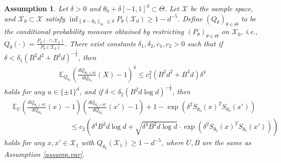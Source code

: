 \documentclass[final,12pt]{colt2018} %
\def \bE {\mathbb{E}}
\newcommand{\calX}{{\mathcal{X}}}
\newtheorem{assumption}{Assumption}
\begin{document}
\begin{assumption}\label{assump.subGaussian}
	Let $\delta>0$ and $\theta_0 + \delta [-1,1]^d\subset \Theta$. Let $\calX$ be the sample space, and $\calX_0\subset \calX$ satisfy $\inf_{\|\theta-\theta_0\|_\infty\le \delta} P_\theta(\calX_0)\ge 1-d^{-5}$. Define $(Q_\theta)_{\theta\in\Theta}$ to be the conditional probability measure obtained by restricting $(P_\theta)_{\theta\in\Theta}$ on $\calX_0$, i.e., $Q_\theta(\cdot) = \frac{P_\theta(\cdot\cap \calX_0)}{P_\theta(\calX_0)}$. There exist constants $\delta_1,\delta_2,c_1,c_2>0$ such that if $\delta<\delta_1(B^2d^2+B^3d)^{-\frac{1}{4}}$, then
	\begin{align}\label{eq.assumption_3_remainder}
	\bE_{Q_{\theta_0}} \left(\frac{dQ_{\theta_0+\delta u}}{dQ_{\theta_0}}(X) - 1\right)^4    \le c_1^2 \left( B^2d^2 + B^3d\right)\delta^4
	\end{align}
	holds for any $u\in \{\pm 1 \}^d$, and if $\delta<\delta_2(B^2d\log d)^{-\frac{1}{4}}$, then
	\begin{equation}\label{eq.assumption_3}
	\begin{split}
	&\bE_{U} \left(\frac{dQ_{\theta_0+\delta U}}{dQ_{\theta_0}}(x)-1\right) \left(\frac{dQ_{\theta_0+\delta U}}{dQ_{\theta_0}}(x') -1 \right) + 1 - \exp(\delta^2S_{\theta_0}(x)^TS_{\theta_0}(x') )  \\
	&\qquad \qquad \qquad \qquad \le c_2(\delta^4B^2d\log d+\sqrt{\delta^4B^2d\log d}\cdot\exp(\delta^2S_{\theta_0}(x)^TS_{\theta_0}(x')) )
	\end{split}
	\end{equation}
	holds for any $x,x'\in \calX_1$ with $Q_{\theta_0}(\calX_1)\ge 1-d^{-5}$, where $U, B$ are the same as Assumption \ref{assump.var}.
\end{assumption}
\end{document}
